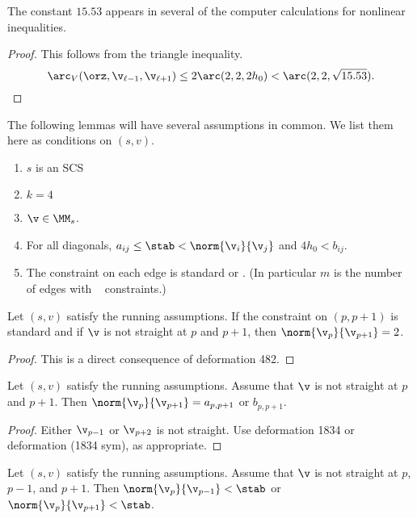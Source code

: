\begin{remark} The constant $15.53$ appears in several of the computer calculations for
nonlinear inequalities.
\end{remark}

\begin{proof}  
This follows from the triangle inequality.
\[
\arc_V(\orz,{\v_{\ell-1}},{\v_{\ell+1}}) \le 2\arc(2,2,2h_0)<\arc(2,2,\sqrt{15.53}).
\]
\end{proof}

\begin{remark} 
The following lemmas will have several assumptions in common.  We list them
here as conditions on $(s,v)$.
\begin{enumerate}
\item $s$ is an SCS
\item $k=4$
\item $\v\in \MM_s$.
\item For all diagonals, $a_{ij} \le \stab < \norm{\v_i}{\v_j}$ and $4h_0 < b_{ij}$.
\item The constraint on each edge is standard or \prop.  (In particular $m$ is the number of edges with \prop~
constraints.)
\end{enumerate}
\end{remark}

\begin{lemma} 
Let $(s,v)$ satisfy the running assumptions.  If the constraint on $(p,p+1)$ is standard
and if $\v$ is not straight at $p$ and $p+1$, then $\norm{\v_p}{\v_{p+1}}=2$.
\end{lemma}

\begin{proof} This is a direct consequence of deformation 482.
\end{proof}

\begin{lemma}[]\label{lemma:tua}
Let $(s,v)$ satisfy the running assumptions.  Assume that $\v$ is not straight at $p$ and $p+1$.
Then $\norm{\v_p}{\v_{p+1}} = a_{p,p+1}$ or $b_{p,p+1}$.
\end{lemma}

\begin{proof} Either $\v_{p-1}$ or $\v_{p+2}$ is not straight.  Use deformation 1834 or deformation (1834 sym),
as appropriate.
\end{proof}

\begin{lemma}[] Let $(s,v)$ satisfy the running assumptions.  Assume that $\v$ is not straight
at $p$, $p-1$, and $p+1$.  Then $\norm{\v_p}{\v_{p-1}} < \stab$ or $\norm{\v_p}{\v_{p+1}} < \stab$.
\end{lemma}

